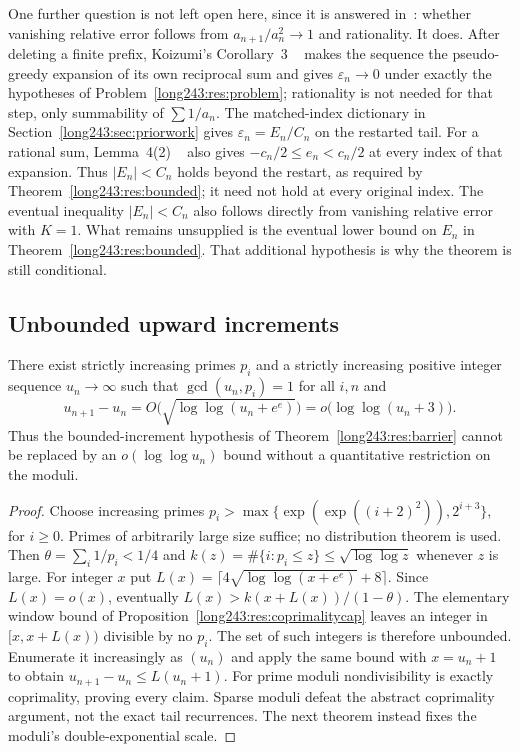 \documentclass[11pt]{article}
\begin{document}
\begin{remark}\label{long243:rem:relative-error-boundary}
One further question is not left open here, since it is answered
in~\cite{koizumi2025}: whether vanishing relative error follows from
$a_{n+1}/a_n^{2}\to1$ and rationality.  It does.  After
deleting a finite prefix, Koizumi's Corollary~3
~\cite[p.~9]{koizumi2025} makes the sequence the pseudo-greedy expansion of its
own reciprocal sum and gives $\varepsilon_n\to0$ under exactly the hypotheses of
Problem~\ref{long243:res:problem}; rationality is not needed for that step, only
summability of $\sum1/a_n$.  The matched-index dictionary in
Section~\ref{long243:sec:priorwork} gives $\varepsilon_n=E_n/C_n$
on the restarted tail. For a rational sum, Lemma~4(2)
~\cite[pp.~11--12]{koizumi2025} also gives
$-c_n/2\le e_n<c_n/2$ at every index of that expansion. Thus
$|E_n|<C_n$ holds beyond the restart, as required by
Theorem~\ref{long243:res:bounded}; it need not hold at every original
index. The eventual inequality $|E_n|<C_n$ also follows directly from vanishing
relative error with $K=1$. What remains unsupplied is the eventual
lower bound on $E_n$ in Theorem~\ref{long243:res:bounded}.
That additional hypothesis is why the theorem is still conditional.
\end{remark}

\subsection{Unbounded upward increments}

\begin{proposition}\label{long243:res:variablerise}
There exist strictly increasing primes $p_i$ and a strictly increasing
positive integer sequence $u_n\to\infty$ such that $\gcd(u_n,p_i)=1$ for
all $i,n$ and
\[
 u_{n+1}-u_n=O\bigl(\sqrt{\log\log(u_n+e^e)}\bigr)
             =o\bigl(\log\log(u_n+3)\bigr).
\]
Thus the bounded-increment hypothesis of
Theorem~\ref{long243:res:barrier} cannot be replaced by an
$o(\log\log u_n)$ bound without a quantitative restriction on the
moduli.
\end{proposition}

\begin{proof}
Choose increasing primes
$p_i>\max\{\exp(\exp((i+2)^2)),2^{i+3}\}$, for $i\ge0$.
Primes of arbitrarily large size suffice; no distribution theorem is used.
Then $\theta=\sum_i1/p_i<1/4$ and
$k(z)=\#\{i:p_i\le z\}\le\sqrt{\log\log z}$ whenever $z$ is large.
For integer $x$ put
$L(x)=\lceil4\sqrt{\log\log(x+e^e)}+8\rceil$.
Since $L(x)=o(x)$, eventually $L(x)>k(x+L(x))/(1-\theta)$.
The elementary window bound of
Proposition~\ref{long243:res:coprimalitycap} leaves an integer in
$[x,x+L(x))$ divisible by no $p_i$. The set of such integers is therefore
unbounded. Enumerate it increasingly as $(u_n)$ and apply the same bound
with $x=u_n+1$ to obtain $u_{n+1}-u_n\le L(u_n+1)$.
For prime moduli nondivisibility is exactly coprimality, proving every
claim. Sparse moduli defeat the abstract coprimality argument, not the exact
tail recurrences. The next theorem instead fixes the moduli's
double-exponential scale.
\end{proof}
\end{document}

